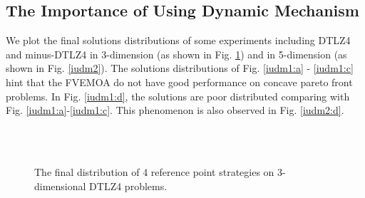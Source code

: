 \documentclass[conference]{IEEEtran}
\begin{document}
\subsection{The Importance of Using Dynamic Mechanism}
We plot the final solutions distributions of some experiments including DTLZ4 and minus-DTLZ4 
in 3-dimension (as shown in Fig. \ref{iudm1}) and in 5-dimension (as shown in Fig. \ref{iudm2}).
The solutions distributions of Fig. \ref{iudm1:a} - \ref{iudm1:c} hint that 
the FVEMOA do not have good performance on concave pareto front problems. 
In Fig. \ref{iudm1:d}, the solutions are poor distributed comparing with Fig. \ref{iudm1:a}-\ref{iudm1:c}.
This phenomenon is also observed in Fig. \ref{iudm2:d}.
\begin{figure}[!t]
  \centering
  \quad
  \\
  \quad
  \\
  \caption{
    The final distribution of 4 reference point strategies on 3-dimensional DTLZ4 problems.
  }
  \label{iudm1}
\end{figure} 
\end{document}
